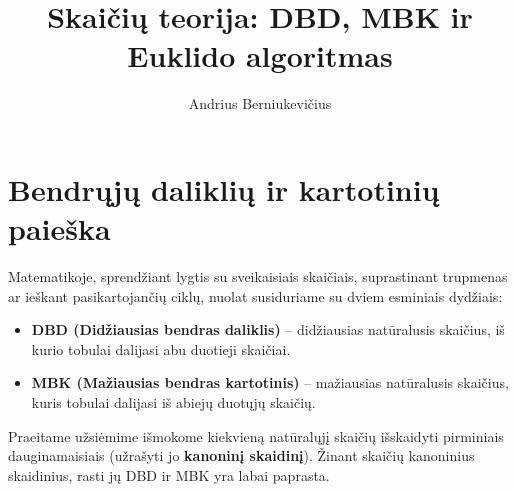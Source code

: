 \documentclass[11pt,a4paper]{scrartcl}
\title{Skaičių teorija: DBD, MBK ir Euklido algoritmas}
\author{Andrius Berniukevičius}
\begin{document}
\maketitle

\section{Bendrųjų daliklių ir kartotinių paieška}

Matematikoje, sprendžiant lygtis su sveikaisiais skaičiais, suprastinant trupmenas ar ieškant pasikartojančių ciklų, nuolat susiduriame su dviem esminiais dydžiais:
\begin{itemize}
    \item \textbf{DBD (Didžiausias bendras daliklis)} – didžiausias natūralusis skaičius, iš kurio tobulai dalijasi abu duotieji skaičiai.
    \item \textbf{MBK (Mažiausias bendras kartotinis)} – mažiausias natūralusis skaičius, kuris tobulai dalijasi iš abiejų duotųjų skaičių.
\end{itemize}

Praeitame užsiėmime išmokome kiekvieną natūralųjį skaičių išskaidyti pirminiais dauginamaisiais (užrašyti jo \textbf{kanoninį skaidinį}). Žinant skaičių kanoninius skaidinius, rasti jų DBD ir MBK yra labai paprasta.

\begin{center}
\end{center}
\end{document}
